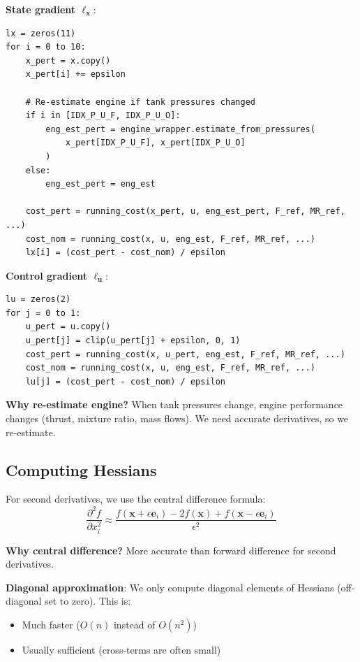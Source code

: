 \documentclass[11pt,a4paper]{article}
\begin{document}
\textbf{State gradient $\ell_{\mathbf{x}}$}:
\begin{verbatim}
lx = zeros(11)
for i = 0 to 10:
    x_pert = x.copy()
    x_pert[i] += epsilon
    
    # Re-estimate engine if tank pressures changed
    if i in [IDX_P_U_F, IDX_P_U_O]:
        eng_est_pert = engine_wrapper.estimate_from_pressures(
            x_pert[IDX_P_U_F], x_pert[IDX_P_U_O]
        )
    else:
        eng_est_pert = eng_est
    
    cost_pert = running_cost(x_pert, u, eng_est_pert, F_ref, MR_ref, ...)
    cost_nom = running_cost(x, u, eng_est, F_ref, MR_ref, ...)
    lx[i] = (cost_pert - cost_nom) / epsilon
\end{verbatim}

\textbf{Control gradient $\ell_{\mathbf{u}}$}:
\begin{verbatim}
lu = zeros(2)
for j = 0 to 1:
    u_pert = u.copy()
    u_pert[j] = clip(u_pert[j] + epsilon, 0, 1)
    cost_pert = running_cost(x, u_pert, eng_est, F_ref, MR_ref, ...)
    cost_nom = running_cost(x, u, eng_est, F_ref, MR_ref, ...)
    lu[j] = (cost_pert - cost_nom) / epsilon
\end{verbatim}

\textbf{Why re-estimate engine?} When tank pressures change, engine performance changes (thrust, mixture ratio, mass flows). We need accurate derivatives, so we re-estimate.

\subsection{Computing Hessians}

For second derivatives, we use the central difference formula:
\begin{equation}
\frac{\partial^2 f}{\partial x_i^2} \approx \frac{f(\mathbf{x} + \epsilon \mathbf{e}_i) - 2f(\mathbf{x}) + f(\mathbf{x} - \epsilon \mathbf{e}_i)}{\epsilon^2}
\end{equation}

\textbf{Why central difference?} More accurate than forward difference for second derivatives.

\textbf{Diagonal approximation}: We only compute diagonal elements of Hessians (off-diagonal set to zero). This is:
\begin{itemize}
    \item Much faster ($O(n)$ instead of $O(n^2)$)
    \item Usually sufficient (cross-terms are often small)
\end{itemize}
\end{document}
